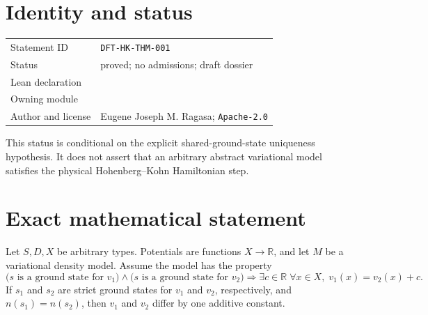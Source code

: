 
\section{Identity and status}
\begin{tabularx}{\textwidth}{@{}lY@{}}
\toprule
Statement ID & \texttt{DFT-HK-THM-001} \\
Status & proved; no admissions; draft dossier \\
Lean declaration &  \\
Owning module &  \\
Author and license & Eugene Joseph M. Ragasa; \texttt{Apache-2.0} \\
\bottomrule
\end{tabularx}
This status is conditional on the explicit shared-ground-state uniqueness hypothesis.  It does not
assert that an arbitrary abstract variational model satisfies the physical Hohenberg--Kohn
Hamiltonian step.

\section{Exact mathematical statement}
Let \(S,D,X\) be arbitrary types.  Potentials are functions \(X\to\mathbb R\), and let
\(M\) be a variational density model.  Assume the model has the property
\[
 \bigl(s\text{ is a ground state for }v_1\bigr)\land
 \bigl(s\text{ is a ground state for }v_2\bigr)
 \Longrightarrow
 \exists c\in\mathbb R\;\forall x\in X,\;v_1(x)=v_2(x)+c.
\]
If \(s_1\) and \(s_2\) are strict ground states for \(v_1\) and \(v_2\), respectively, and
\(n(s_1)=n(s_2)\), then \(v_1\) and \(v_2\) differ by one additive constant.

